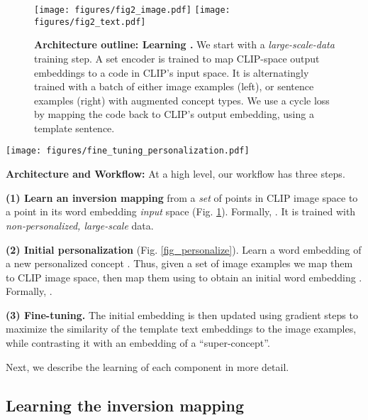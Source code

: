 \documentclass[runningheads]{llncs}
\newcommand{\figref}[1]{Fig. \ref{#1}}
\newcommand\edit[1]{#1}
\begin{document}
\begin{figure}[h]
    \centering
    \texttt{[image: figures/fig2\_image.pdf]} \texttt{[image: figures/fig2\_text.pdf]} \caption{\textbf{Architecture outline: Learning .} We start with a \textit{large-scale-data} training step. A set encoder  is trained to map CLIP-space output embeddings to a code in CLIP's input space. It is alternatingly trained with a batch of either image examples (left), or sentence examples (right) with augmented concept types. We use a cycle loss by mapping the code back to CLIP's output embedding, using a template sentence.}\label{fig_ftheta}
\end{figure}


\begin{SCfigure}
    \centering
    \texttt{[image: figures/fine\_tuning\_personalization.pdf]} \caption{\textbf{Architecture outline: Personalization.}  Given a set of examples of a personalized concept and its type (skirt), we embed them with CLIP and predict an initial code () for the concept using a frozen . We then further tune the code with a contrastive loss.}
    \label{fig_personalize}
\end{SCfigure}


\noindent\textbf{Architecture and Workflow:}
At a high level, our workflow has three steps.  

\textbf{(1)  Learn an inversion mapping  } from a \textit{set} of points in CLIP image space  to a point in its word embedding \textit{input} space  (\figref{fig_ftheta}).
Formally, . It is trained with \textit{non-personalized, large-scale} data.

\textbf{(2) Initial personalization} (\figref{fig_personalize}). Learn a word embedding  of a new personalized concept . Thus, given a set of image examples  we map them to CLIP image space, then map them using  to obtain an initial word embedding .
Formally, .

\textbf{(3) Fine-tuning.} The initial embedding  is then updated using gradient steps \edit{to maximize the similarity of the template text embeddings to the image examples, while contrasting it with an embedding of a ``super-concept''.}

Next, we describe the learning of each component in more detail.



\subsection{Learning the inversion mapping }
\end{document}
